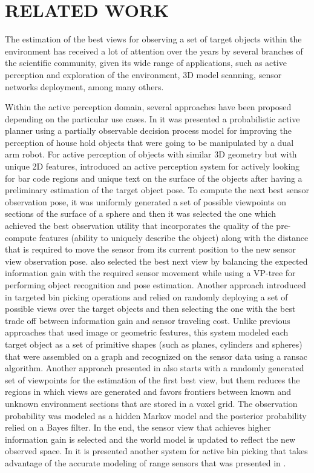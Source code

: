 \section{\uppercase{Related Work}}\label{sec:related-work}

\noindent The estimation of the best views for observing a set of target objects within the environment has received a lot of attention over the years by several branches of the scientific community, given its wide range of applications, such as active perception and exploration of the environment, 3D model scanning, sensor networks deployment, among many others.

Within the active perception domain, several approaches have been proposed depending on the particular use cases. In \cite{Eidenberger2010} it was presented a probabilistic active planner using a partially observable decision process model for improving the perception of house hold objects that were going to be manipulated by a dual arm robot. For active perception of objects with similar 3D geometry but with unique 2D features, \cite{Stampfer2012} introduced an active perception system for actively looking for bar code regions and unique text on the surface of the objects after having a preliminary estimation of the target object pose. To compute the next best sensor observation pose, it was uniformly generated a set of possible viewpoints on sections of the surface of a sphere and then it was selected the one which achieved the best observation utility that incorporates the quality of the pre-compute features (ability to uniquely describe the object) along with the distance that is required to move the sensor from its current position to the new sensor view observation pose. \cite{Atanasov2014} also selected the best next view by balancing the expected information gain with the required sensor movement while using a VP-tree for performing object recognition and pose estimation. Another approach introduced in \cite{Nieuwenhuisen2013,Holz2014} targeted bin picking operations and relied on randomly deploying a set of possible views over the target objects and then selecting the one with the best trade off between information gain and sensor traveling cost. Unlike previous approaches that used image or geometric features, this system modeled each target object as a set of primitive shapes (such as planes, cylinders and spheres) that were assembled on a graph and recognized on the sensor data using a \gls{ransac} algorithm. Another approach presented in \cite{Potthast2014} also starts with a randomly generated set of viewpoints for the estimation of the first best view, but them reduces the regions in which views are generated and favors frontiers between known and unknown environment sections that are stored in a voxel grid. The observation probability was modeled as a hidden Markov model and the posterior probability relied on a Bayes filter. In the end, the sensor view that achieves higher information gain is selected and the world model is updated to reflect the new observed space. In \cite{Mezei2016} it is presented another system for active bin picking that takes advantage of the accurate modeling of range sensors that was presented in \cite{Gschwandtner2011}.

